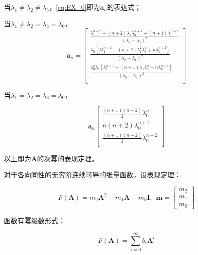 \documentclass[UTF8,zihao=5]{ctexart}
\newcommand{\bm}[1]{{\mathbf{#1}}}
\begin{document}
当$\lambda_1\neq\lambda_2\neq\lambda_3$，\eqref{eq:EX_0}即为$\bm{a}_n$的表达式；

当$\lambda_1\neq\lambda_2=\lambda_3=\lambda_0$，
\begin{equation}
    \bm{a}_n=\begin{bmatrix}
        \frac{\lambda_1^{n+2}-(n+2)\lambda_1\lambda_0^{n+1}+(n+1)\lambda_0^{n+2}}{(\lambda_0-\lambda_1)^2}\\
        \frac{
            \lambda_0\left[
                2\lambda_1^{n+2}-(n+2)\lambda_1^2\lambda_0^{n}+n\lambda_0^{n+2}
                \right]
                }{(\lambda_0-\lambda_1)^2}\\
        \frac{
            \lambda_0^2\lambda_1
            \left[
            \lambda_1^{n+1}-(n+1)\lambda_1\lambda_0^{n}+n\lambda_0^{n+1}
            \right]
            }{(\lambda_0-\lambda_1)^2}\\
    \end{bmatrix}
    \label{eq:EX_1}
\end{equation}

当$\lambda_1=\lambda_2=\lambda_3=\lambda_0$，

\begin{equation}
    \bm{a}_n
    \begin{bmatrix}
        \frac{(n+1)(n+2)}{2}\lambda_0^{n}\\
        n(n+2)\lambda_0^{n+1}\\
        \frac{(n+1)(n+2)}{2}\lambda_0^{n+2}\\
    \end{bmatrix}
    \label{eq:EX_2}
\end{equation}

以上即为$\bm{A}$的次幂的表现定理。

对于各向同性的无穷阶连续可导的张量函数，设表现定理：

\begin{equation}
    F(\bm{A})=m_2\bm{A}^2-m_1\bm{A}+m_0\bm{I},\ \ \bm{m}=\begin{bmatrix}
        m_2\\m_1\\m_0
    \end{bmatrix}
\end{equation}

函数有幂级数形式：

\begin{equation}
    F(\bm{A})=\sum_{i=0}^\infty{b_i\bm{A}^i}
    \label{eq:F_taylor}
\end{equation}
\end{document}

